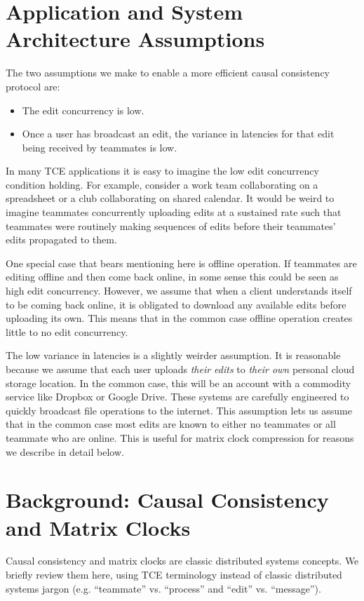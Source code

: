 \documentclass[runningheads]{llncs}
\begin{document}
\section{Application and System Architecture Assumptions}

The two assumptions we make to enable a more efficient causal consistency protocol are:

\begin{itemize}
\item The edit concurrency is low.
\item Once a user has broadcast an edit, the variance in latencies for that edit being received by teammates is low.
\end{itemize}

In many TCE applications it is easy to imagine the low edit concurrency condition holding.
For example, consider a work team collaborating on a spreadsheet or a club collaborating on shared calendar.
It would be weird to imagine teammates concurrently uploading edits at a sustained rate such that teammates were routinely making sequences of edits before their teammates' edits propagated to them.

One special case that bears mentioning here is offline operation.
If teammates are editing offline and then come back online, in some sense this could be seen as high edit concurrency.
However, we assume that when a client understands itself to be coming back online, it is obligated to download any available edits before uploading its own.
This means that in the common case offline operation creates little to no edit concurrency.

The low variance in latencies is a slightly weirder assumption.
It is reasonable because we assume that each user uploads \emph{their edits} to \emph{their own} personal cloud storage location.
In the common case, this will be an account with a commodity service like Dropbox or Google Drive.
These systems are carefully engineered to quickly broadcast file operations to the internet.
This assumption lets us assume that in the common case most edits are known to either no teammates or all teammate who are online.
This is useful for matrix clock compression for reasons we describe in detail below.

\section{Background: Causal Consistency and Matrix Clocks}

Causal consistency and matrix clocks are classic distributed systems concepts.
We briefly review them here, using TCE terminology instead of classic distributed systems jargon (e.g. ``teammate'' vs. ``process'' and ``edit'' vs. ``message'').
\end{document}
